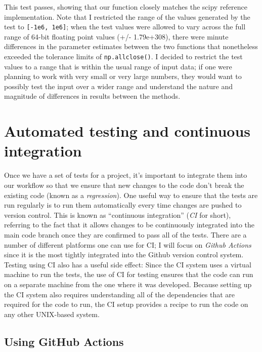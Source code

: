 

This test passes, showing that our function closely matches the scipy reference implementation.
Note that I restricted the range of the values generated by the test to \texttt{[-1e6, 1e6]}; when the test values were allowed to vary across the full range of 64-bit floating point values (+/- 1.79e+308), there were minute differences in the parameter estimates between the two functions that nonetheless exceeded the tolerance limits of \texttt{np.allclose()}.
I decided to restrict the test values to a range that is within the usual range of input data; if one were planning to work with very small or very large numbers, they would want to possibly test the input over a wider range and understand the nature and magnitude of differences in results between the methods.

\section{Automated testing and continuous integration}

Once we have a set of tests for a project, it's important to integrate them into our workflow so that we ensure that new changes to the code don't break the existing code (known as a \textit{regression}).
One useful way to ensure that the tests are run regularly is to run them automatically every time changes are pushed to version control.
This is known as ``continuous integration'' (\textit{CI} for short), referring to the fact that it allows changes to be continuously integrated into the main code branch once they are confirmed to pass all of the tests.
There are a number of different platforms one can use for CI; I will focus on \textit{Github Actions} since it is the most tightly integrated into the Github version control system.
Testing using CI also has a useful side effect: Since the CI system uses a virtual machine to run the tests, the use of CI for testing ensures that the code can run on a separate machine from the one where it was developed.
Because setting up the CI system also requires understanding all of the dependencies that are required for the code to run, the CI setup provides a recipe to run the code on any other UNIX-based system.

\subsection{Using GitHub Actions}


